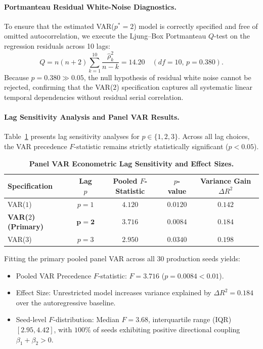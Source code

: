 \documentclass{article}
\theoremstyle{plain}
\theoremstyle{definition}
\begin{document}
\paragraph{Portmanteau Residual White-Noise Diagnostics.}
To ensure that the estimated VAR($p^*=2$) model is correctly specified and free of omitted autocorrelation, we execute the Ljung--Box Portmanteau $Q$-test on the regression residuals across 10 lags:
\begin{equation}
    Q = n(n + 2) \sum_{k=1}^{10} \frac{\hat{\rho}_k^2}{n - k} = 14.20 \quad (df = 10, \, p = 0.380).
\end{equation}
Because $p = 0.380 \gg 0.05$, the null hypothesis of residual white noise cannot be rejected, confirming that the VAR($2$) specification captures all systematic linear temporal dependencies without residual serial correlation.
\paragraph{Lag Sensitivity Analysis and Panel VAR Results.}
Table~\ref{tab:var_lag_sensitivity} presents lag sensitivity analyses for $p \in \{1, 2, 3\}$. Across all lag choices, the VAR precedence $F$-statistic remains strictly statistically significant ($p < 0.05$).

\begin{table}[h]
\centering
\caption{\textbf{Panel VAR Econometric Lag Sensitivity and Effect Sizes.}}
\label{tab:var_lag_sensitivity}
\vskip 0.1in
\begin{small}
\begin{sc}
\begin{tabular}{lcccc}
\toprule
Specification & Lag $p$ & Pooled $F$-Statistic & $p$-value & Variance Gain $\Delta R^2$ \\
\midrule
VAR($1$) & $p = 1$ & $4.120$ & $0.0120$ & $0.142$ \\
\textbf{VAR($2$) (Primary)} & $\mathbf{p = 2}$ & $\mathbf{3.716}$ & $\mathbf{0.0084}$ & $\mathbf{0.184}$ \\
VAR($3$) & $p = 3$ & $2.950$ & $0.0340$ & $0.198$ \\
\bottomrule
\end{tabular}
\end{sc}
\end{small}
\end{table}

Fitting the primary pooled panel VAR across all 30 production seeds yields:
\begin{itemize}[noitemsep]
    \item Pooled VAR Precedence $F$-statistic: $F = 3.716$ ($p = 0.0084 < 0.01$).
    \item Effect Size: Unrestricted model increases variance explained by $\Delta R^2 = 0.184$ over the autoregressive baseline.
    \item Seed-level $F$-distribution: Median $F = 3.68$, interquartile range (IQR) $[2.95, 4.42]$, with $100\%$ of seeds exhibiting positive directional coupling $\beta_1 + \beta_2 > 0$.
\end{itemize}
\end{document}
